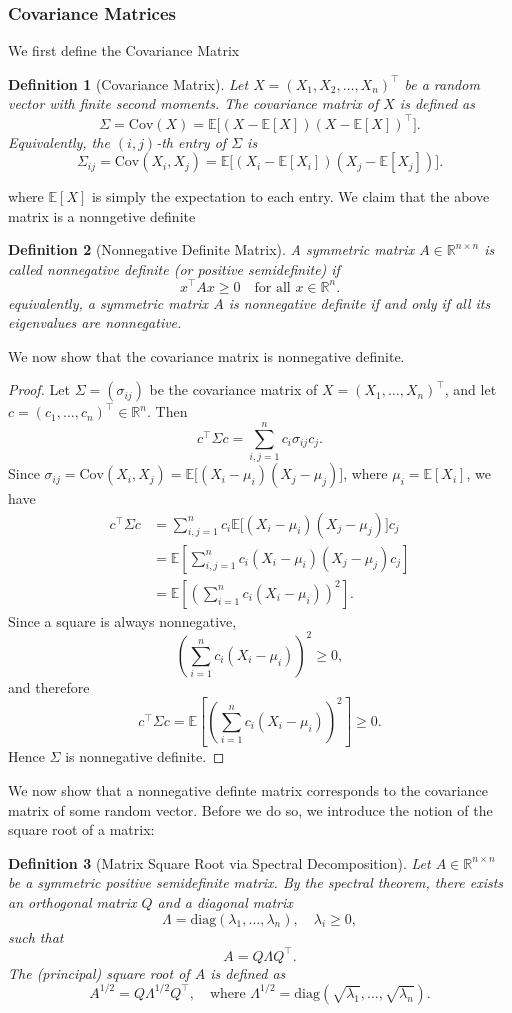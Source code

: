 \documentclass[12pt]{article}
\newtheorem{definition}{Definition}
\newcommand{\E}{\mathbb{E}}
\newcommand{\Cov}{\text{Cov}}
\begin{document}
\subsubsection{Covariance Matrices}
We first define the Covariance Matrix 
\begin{definition}[Covariance Matrix]
Let $X = (X_1, X_2, \dots, X_n)^\top$ be a random vector with finite second moments. The \emph{covariance matrix} of $X$ is defined as
\[
\Sigma = \Cov(X) = \E\big[(X - \E[X])(X - \E[X])^\top\big].
\]
Equivalently, the $(i,j)$-th entry of $\Sigma$ is
\[
\Sigma_{ij} = \Cov(X_i, X_j) = \E\big[(X_i - \E[X_i])(X_j - \E[X_j])\big].
\]
\end{definition}
\noindent{}
where $\E[X]$ is simply the expectation to each entry. We claim that the above matrix is a nonngetive definite
\begin{definition}[Nonnegative Definite Matrix]
A symmetric matrix $A \in \mathbb{R}^{n \times n}$ is called \emph{nonnegative definite} (or \emph{positive semidefinite}) if
\[
x^\top A x \ge 0 \quad \text{for all } x \in \mathbb{R}^n.
\]
equivalently, a symmetric matrix $A$ is nonnegative definite if and only if all its eigenvalues are nonnegative.
\end{definition}
\noindent
We now show that the covariance matrix is nonnegative definite. 
\begin{proof}
Let $\Sigma = (\sigma_{ij})$ be the covariance matrix of $X = (X_1,\dots,X_n)^\top$, and let $c = (c_1,\dots,c_n)^\top \in \mathbb{R}^n$. Then
\[
c^\top \Sigma c
= \sum_{i,j=1}^n c_i \sigma_{ij} c_j.
\]
Since $\sigma_{ij} = \Cov(X_i,X_j) = \E\big[(X_i-\mu_i)(X_j-\mu_j)\big]$, where $\mu_i = \E[X_i]$, we have
\begin{align*}
c^\top \Sigma c
&= \sum_{i,j=1}^n c_i \E\big[(X_i-\mu_i)(X_j-\mu_j)\big] c_j \\
&= \E\left[\sum_{i,j=1}^n c_i (X_i-\mu_i)(X_j-\mu_j)c_j\right] \\
&= \E\left[\left(\sum_{i=1}^n c_i (X_i-\mu_i)\right)^2\right].
\end{align*}
Since a square is always nonnegative,
\[
\left(\sum_{i=1}^n c_i (X_i-\mu_i)\right)^2 \ge 0,
\]
and therefore
\[
c^\top \Sigma c
= \E\left[\left(\sum_{i=1}^n c_i (X_i-\mu_i)\right)^2\right] \ge 0.
\]
Hence $\Sigma$ is nonnegative definite.
\end{proof}
\noindent 
We now show that a nonnegative definte matrix corresponds to the covariance matrix of some random vector. Before we do so, we introduce the notion of the square root of a matrix:
\begin{definition}[Matrix Square Root via Spectral Decomposition]
Let $A \in \mathbb{R}^{n \times n}$ be a symmetric positive semidefinite matrix. By the spectral theorem, there exists an orthogonal matrix $Q$ and a diagonal matrix 
\[
\Lambda = \mathrm{diag}(\lambda_1,\dots,\lambda_n), \quad \lambda_i \ge 0,
\]
such that
\[
A = Q \Lambda Q^\top.
\]
The (principal) square root of $A$ is defined as
\[
A^{1/2} = Q \Lambda^{1/2} Q^\top,
\quad \text{where } \Lambda^{1/2} = \mathrm{diag}(\sqrt{\lambda_1},\dots,\sqrt{\lambda_n}).
\]
\end{definition}
\end{document}
